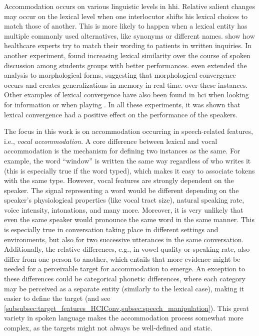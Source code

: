 Accommodation occurs on various linguistic levels in \ac{hhi}.
Relative salient changes may occur on the lexical level when one interlocutor shifts his lexical choices to match those of another.
This is more likely to happen when a lexical entity has multiple commonly used alternatives, like synonyms or different names.
\citet{Jucks2008lexical} show how healthcare experts try to match their wording to patients in written inquiries.
In another experiment, \citet{Friedberg2012lexical} found increasing lexical similarity over the course of spoken discussion among students groups with better performances.
\citet{Racz2020morphological} even extended the analysis to morphological forms, suggesting that morphological convergence occurs and creates generalizations in memory in real-time.
over these instances.
Other examples of lexical convergence have also been found in \ac{hci} when looking for information \citep{Lopes2013lexical} or when playing \citep[][and see \cref{subsec:previous_work}]{Bergqvist2020nontrivial}.
In all these experiments, it was shown that lexical convergence had a positive effect on the performance of the speakers.

The focus in this work is on accommodation occurring in speech-related features, i.e., \emph{vocal accommodation}.
A core difference between lexical and vocal accommodation is the mechanism for defining two instances as the same.
For example, the word \enquote{window} is written the same way regardless of who writes it (this is especially true if the word typed), which makes it easy to associate tokens with the same type.
However, vocal features are strongly dependent on the speaker.
The signal representing a word would be different depending on the speaker's physiological properties (like vocal tract size), natural speaking rate, voice intensity, intonations, and many more.
Moreover, it is very unlikely that even the same speaker would pronounce the same word in the same manner.
This is especially true in conversation taking place in different settings and environments, but also for two successive utterances in the same conversation.
Additionally, the relative differences, e.g., in vowel quality or speaking rate, also differ from one person to another, which entails that more evidence might be needed for a perceivable target for accommodation to emerge.
An exception to these differences could be categorical phonetic differences, where each category may be perceived as a separate entity (similarly to the lexical case), making it easier to define the target (and see \cref{subsubsec:target_features_HCIConv,subsec:speech_manipulation}).
This great variety in spoken language makes the accommodation process somewhat more complex, as the targets might not always be well-defined and static.

